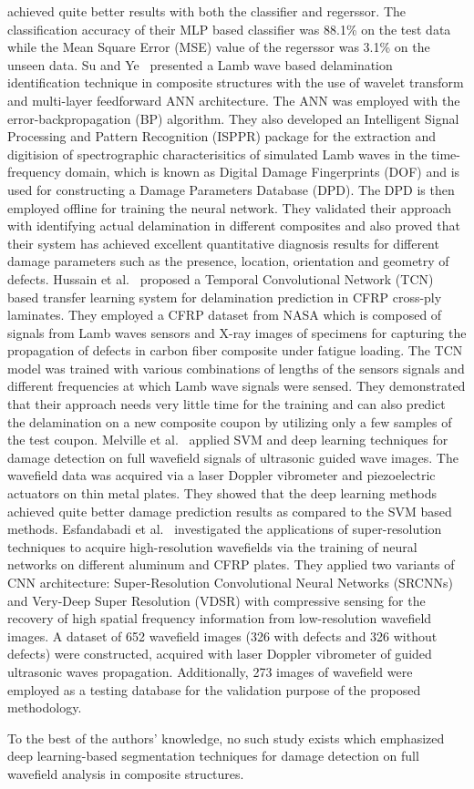 achieved quite better results with both the classifier and regerssor. The classification accuracy of their MLP based classifier was 88.1\% on the test data while the Mean Square Error (MSE) value of the regerssor was 3.1\% on the unseen data. Su and Ye~\cite{su2004lamb} presented a Lamb wave based delamination identification technique in composite structures with the use of wavelet transform and multi-layer feedforward ANN architecture. The ANN was employed with the error-backpropagation (BP) algorithm. They also developed an Intelligent Signal Processing and Pattern Recognition (ISPPR) package for the extraction and digitision of spectrographic characterisitics of simulated Lamb waves in the time-frequency domain, which is known as Digital Damage Fingerprints (DOF) and is used for constructing a Damage Parameters Database (DPD). The DPD is then employed offline for training the neural network. They validated their approach with identifying actual delamination in different composites and also proved that their system has achieved excellent quantitative diagnosis results for different damage parameters such as the presence, location, orientation and geometry of defects. Hussain et al.~\cite{hussaintemporal} proposed a Temporal Convolutional Network (TCN) based transfer learning system for delamination prediction in CFRP cross-ply laminates. They employed a CFRP dataset from NASA which is composed of signals from Lamb waves sensors and X-ray images of specimens for capturing the propagation of defects in carbon fiber composite under fatigue loading. The TCN model was trained with various combinations of lengths of the sensors signals and different frequencies at which Lamb wave signals were sensed. They demonstrated that their approach needs very little time for the training and can also predict the delamination on a new composite coupon by utilizing only a few samples of the test coupon. Melville et al.~\cite{melville2018structural} applied SVM and deep learning techniques for damage detection on full wavefield signals of ultrasonic guided wave images. The wavefield data was acquired via a laser Doppler vibrometer and piezoelectric actuators on thin metal plates. They showed that the deep learning methods achieved quite better damage prediction results as compared to the SVM based methods. Esfandabadi et al.~\cite{keshmiri2019deep} investigated the applications of super-resolution techniques to acquire high-resolution wavefields via the training of neural networks on different aluminum and CFRP plates. They applied two variants of CNN architecture: Super-Resolution Convolutional Neural Networks (SRCNNs) and Very-Deep Super Resolution (VDSR) with compressive sensing for the recovery of high spatial frequency information from low-resolution wavefield images. A dataset of 652 wavefield images (326 with defects and 326 without defects) were constructed, acquired with laser Doppler vibrometer of guided ultrasonic waves propagation. Additionally, 273 images of wavefield were employed as a testing database for the validation purpose of the proposed methodology.           

To the best of the authors' knowledge, no such study exists which emphasized deep learning-based segmentation techniques for damage detection on full wavefield analysis in composite structures.